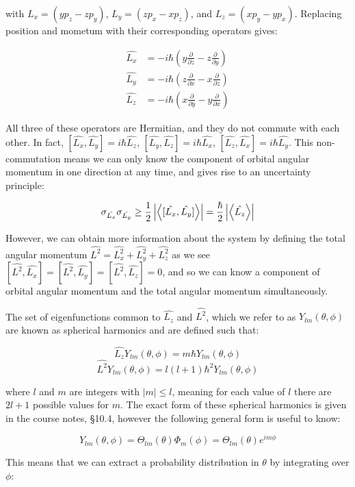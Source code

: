 with $L_x = (yp_z - zp_y)$, $L_y = (zp_x - xp_z)$, and $L_z = (xp_y - yp_x)$. Replacing position and mometum with their corresponding operators gives:

\begin{align*}
\hat{L_x} &= -i\hbar\left(y\frac{\partial}{\partial z} - z\frac{\partial}{\partial y}\right) \\
\hat{L_y} &= -i\hbar\left(z\frac{\partial}{\partial x} - x\frac{\partial}{\partial z}\right) \\
\hat{L_z} &= -i\hbar\left(x\frac{\partial}{\partial y} - y\frac{\partial}{\partial x}\right) 
\end{align*}

All three of these operators are Hermitian, and they do not commute with each other. In fact, $[\hat{L_x}, \hat{L_y}] = i\hbar\hat{L_z}$, $[\hat{L_y}, \hat{L_z}] = i\hbar\hat{L_x}$, $[\hat{L_z}, \hat{L_x}] = i\hbar\hat{L_y}$. This non-commutation means we can only know the component of orbital angular momentum in one direction at any time, and gives rise to an uncertainty principle:

\[ \sigma_{\hat{L_x}}\sigma_{\hat{L_y}} \geq \frac{1}{2}\left|\expval{[\hat{L_x},\hat{L_y}]}\right| = \frac{\hbar}{2}\left|\expval{\hat{L_z}}\right| \]

However, we can obtain more information about the system by defining the total angular momentum $\hat{L^2} = \hat{L_x^2} + \hat{L_y^2} + \hat{L_z^2}$ as we see $[\hat{L^2},\hat{L_x}] = [\hat{L^2}, \hat{L_y}] = [\hat{L^2}, \hat{L_z}] = 0$, and so we can know a component of orbital angular momentum and the total angular momentum simultaneously. 

The set of eigenfunctions common to $\hat{L_z}$ and $\hat{L^2}$, which we refer to as $Y_{lm}(\theta, \phi)$ are known as spherical harmonics and are defined such that:

\[ \hat{L_z}Y_{lm}(\theta, \phi) = m\hbar Y_{lm}(\theta, \phi) \]
\[ \hat{L^2}Y_{lm}(\theta, \phi) = l(l+1)\hbar^2 Y_{lm}(\theta, \phi) \]

where $l$ and $m$ are integers with $|m| \leq l$, meaning for each value of $l$ there are $2l+1$ possible values for $m$. The exact form of these spherical harmonics is given in the course notes, §10.4, however the following general form is useful to know:

\[ Y_{lm}(\theta, \phi) = \Theta_{lm}(\theta)\Phi_m(\phi) = \Theta_{lm}(\theta)e^{im\phi} \]

This means that we can extract a probability distribution in $\theta$ by integrating over $\phi$:

